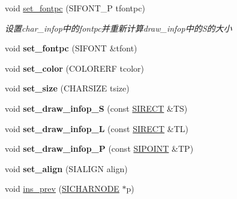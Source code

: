 \begin{DoxyCompactItemize}
\mbox{\label{class_s_i_c_h_a_r_n_o_d_e_aad179bc8f8fc9a4789e0b9ba06ecef9a}} 
void \hyperlink{class_s_i_c_h_a_r_n_o_d_e_aad179bc8f8fc9a4789e0b9ba06ecef9a}{set\+\_\+fontpc} (S\+I\+F\+O\+N\+T\+\_\+P tfontpc)
\begin{DoxyCompactList}\small\item\em 设置char\+\_\+infop中的fontpc并重新计算draw\+\_\+infop中的\+S的大小 \end{DoxyCompactList}\item 
\mbox{\label{class_s_i_c_h_a_r_n_o_d_e_a31c2182d80551b2d92cc13f8c966d5e7}} 
void {\bfseries set\+\_\+fontpc} (S\+I\+F\+O\+NT \&tfont)
\item 
\mbox{\label{class_s_i_c_h_a_r_n_o_d_e_a178979e4d98192f354dcccf93b18202b}} 
void {\bfseries set\+\_\+color} (C\+O\+L\+O\+R\+E\+RF tcolor)
\item 
\mbox{\label{class_s_i_c_h_a_r_n_o_d_e_a22ad69de5483e52b83a380d700112d33}} 
void {\bfseries set\+\_\+size} (C\+H\+A\+R\+S\+I\+ZE tsize)
\item 
\mbox{\label{class_s_i_c_h_a_r_n_o_d_e_ab6b5d998c28439e54749bb5502cdeec2}} 
void {\bfseries set\+\_\+draw\+\_\+infop\+\_\+S} (const \hyperlink{struct_s_i_r_e_c_t}{S\+I\+R\+E\+CT} \&TS)
\item 
\mbox{\label{class_s_i_c_h_a_r_n_o_d_e_abe788ffb5847e2be9bb047d57e8666f7}} 
void {\bfseries set\+\_\+draw\+\_\+infop\+\_\+L} (const \hyperlink{struct_s_i_r_e_c_t}{S\+I\+R\+E\+CT} \&TL)
\item 
\mbox{\label{class_s_i_c_h_a_r_n_o_d_e_a52e5c4ff341d7276063e6441452b4c3f}} 
void {\bfseries set\+\_\+draw\+\_\+infop\+\_\+P} (const \hyperlink{struct_s_i_p_o_i_n_t}{S\+I\+P\+O\+I\+NT} \&TP)
\item 
\mbox{\label{class_s_i_c_h_a_r_n_o_d_e_aa84ae4bcf6cc7eba84a0c93f3d1c6bc9}} 
void {\bfseries set\+\_\+align} (S\+I\+A\+L\+I\+GN align)
\item 
void \hyperlink{class_s_i_c_h_a_r_n_o_d_e_a0aba68c10438db18bea07bb77d70f839}{ins\+\_\+prev} (\hyperlink{class_s_i_c_h_a_r_n_o_d_e}{S\+I\+C\+H\+A\+R\+N\+O\+DE} $\ast$p)

\end{DoxyCompactItemize}
